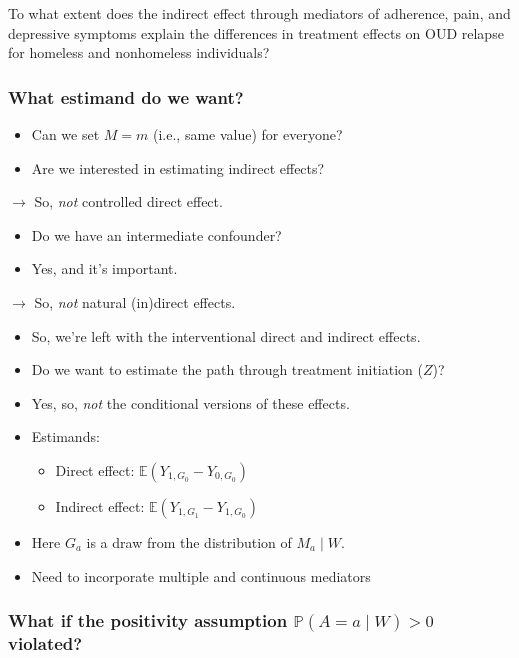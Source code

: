 \documentclass[
  12pt,
]{book}
\providecommand{\tightlist}{%
  \setlength{\itemsep}{0pt}\setlength{\parskip}{0pt}}
\theoremstyle{definition}
\theoremstyle{definition}
\theoremstyle{definition}
\renewcommand{\P}{\mathbb{P}}
\newcommand{\E}{\mathbb{E}}
\newcommand{\1}{\mathbbm{1}}
\begin{document}
To what extent does the indirect effect through mediators of adherence, pain, and
depressive symptoms explain the differences in treatment effects on OUD relapse
for homeless and nonhomeless individuals?

\hypertarget{what-estimand-do-we-want}{%
\subsubsection*{What estimand do we want?}\label{what-estimand-do-we-want}}


\begin{itemize}
\tightlist
\item
  Can we set \(M=m\) (i.e., same value) for everyone?
\item
  Are we interested in estimating indirect effects?
\end{itemize}

\(\rightarrow\) So, \emph{not} controlled direct effect.

\begin{itemize}
\tightlist
\item
  Do we have an intermediate confounder?
\item
  Yes, and it's important.
\end{itemize}

\(\rightarrow\) So, \emph{not} natural (in)direct effects.

\begin{itemize}
\tightlist
\item
  So, we're left with the interventional direct and indirect effects.
\item
  Do we want to estimate the path through treatment initiation (\(Z\))?
\item
  Yes, so, \emph{not} the conditional versions of these effects.
\item
  Estimands:

  \begin{itemize}
  \tightlist
  \item
    Direct effect: \(\E(Y_{1,G_0} - Y_{0,G_0})\)
  \item
    Indirect effect: \(\E(Y_{1,G_1} - Y_{1,G_0})\)
  \end{itemize}
\item
  Here \(G_a\) is a draw from the distribution of \(M_a\mid W\).
\item
  Need to incorporate multiple and continuous mediators
\end{itemize}

\hypertarget{what-if-the-positivity-assumption-paamid-w0-violated}{%
\subsubsection*{\texorpdfstring{What if the positivity assumption \(\P(A=a\mid W)>0\) violated?}{What if the positivity assumption \textbackslash P(A=a\textbackslash mid W)\textgreater0 violated?}}\label{what-if-the-positivity-assumption-paamid-w0-violated}}
\end{document}
